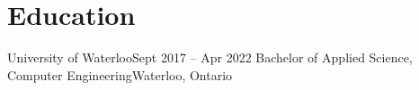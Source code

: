 \section{Education}
  \resumeSubHeadingListStart
    \resumeSubheading
      {University of Waterloo}{Sept 2017 -- Apr 2022}
      {Bachelor of Applied Science, Computer Engineering}{Waterloo, Ontario}
  \resumeSubHeadingListEnd